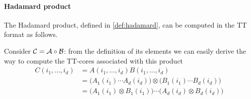 \paragraph{Hadamard product} The Hadamard product, defined in \ref{def:hadamard}, can be computed in the TT format as follows.

Consider $\mathcal{C} = \mathcal{A} \circ \mathcal{B}$: from the definition of its elements we can easily derive the way to compute the TT-cores associated with this product
\begin{equation*}
  \begin{split}
    C(i_1,\ldots,i_d) &= A(i_1,\ldots,i_d) B(i_1,\ldots,i_d)\\
    &= \Big( A_1(i_1) \cdots A_d(i_d) \Big) \otimes \Big( B_1(i_1) \cdots B_d(i_d) \Big) \\
    &= \Big( A_1(i_1) \otimes B_1(i_1) \Big) \cdots \Big( A_d(i_d) \otimes B_d(i_d) \Big)
  \end{split}
\end{equation*}

